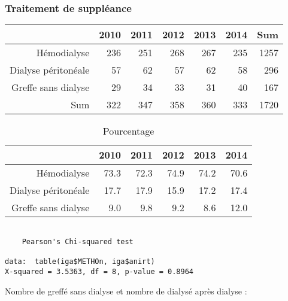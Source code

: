 \documentclass[11pt,a4paper]{article}\usepackage[]{graphicx}\usepackage[]{color}
\makeatletter
\newenvironment{kframe}{%
 \def\at@end@of@kframe{}%
 \ifinner\ifhmode%
  \def\at@end@of@kframe{\end{minipage}}%
  \begin{minipage}{\columnwidth}%
 \fi\fi%
 \def\FrameCommand##1{\hskip\@totalleftmargin \hskip-\fboxsep
 \colorbox{shadecolor}{##1}\hskip-\fboxsep
     \hskip-\linewidth \hskip-\@totalleftmargin \hskip\columnwidth}%
 \MakeFramed {\advance\hsize-\width
   \@totalleftmargin\z@ \linewidth\hsize
   \@setminipage}}%
 {\par\unskip\endMakeFramed%
 \at@end@of@kframe}
\newenvironment{knitrout}{}{} %
\makeatother
\begin{document}
    \subsubsection{Traitement de suppléance}

\begin{table}[ht]
\centering
\begin{tabular}{rrrrrrr}
  \hline
 & 2010 & 2011 & 2012 & 2013 & 2014 & Sum \\ 
  \hline
Hémodialyse & 236 & 251 & 268 & 267 & 235 & 1257 \\ 
  Dialyse péritonéale & 57 & 62 & 57 & 62 & 58 & 296 \\ 
  Greffe sans dialyse & 29 & 34 & 33 & 31 & 40 & 167 \\ 
  Sum & 322 & 347 & 358 & 360 & 333 & 1720 \\ 
   \hline
\end{tabular}
\end{table}
\begin{table}[ht]
\centering
\begin{tabular}{rrrrrr}
  \hline
 & 2010 & 2011 & 2012 & 2013 & 2014 \\ 
  \hline
Hémodialyse & 73.3 & 72.3 & 74.9 & 74.2 & 70.6 \\ 
  Dialyse péritonéale & 17.7 & 17.9 & 15.9 & 17.2 & 17.4 \\ 
  Greffe sans dialyse & 9.0 & 9.8 & 9.2 & 8.6 & 12.0 \\ 
   \hline
\end{tabular}
\caption{Pourcentage} 
\end{table}


\begin{knitrout}
\color{fgcolor}\begin{kframe}
\begin{verbatim}

	Pearson's Chi-squared test

data:  table(iga$METHOn, iga$anirt)
X-squared = 3.5363, df = 8, p-value = 0.8964
\end{verbatim}
\end{kframe}
\end{knitrout}

Nombre de greffé sans dialyse et nombre de dialysé après dialyse :
\end{document}
